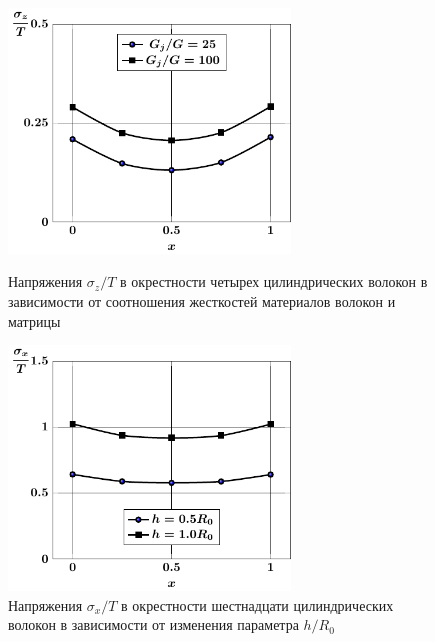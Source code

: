 \begin{figure}[h!]
\centering\footnotesize
\parbox[b]{7.5cm}{\centering\includegraphics[width=7.5cm]{inclusion-4-z-g.pdf}
\caption{Напряжения $\sigma_z/T$ в окрестности четырех цилиндрических волокон в зависимости от соотношения жесткостей материалов волокон и матрицы
\label{f:7:60}}}\hfil\hfil
\parbox[b]{7.5cm}{\centering\includegraphics[width=7.5cm]{inclusion-16-x-h.pdf}
\caption{Напряжения $\sigma_x/T$ в окрестности шестнадцати цилиндрических волокон в зависимости от изменения параметра $h/R_0$
\label{f:7:61}}}
\end{figure}

%

